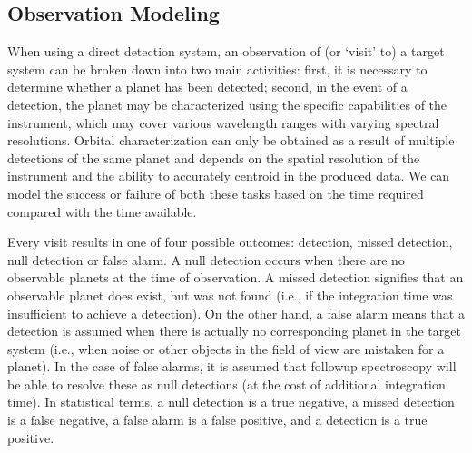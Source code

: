 \subsection{Observation Modeling}\label{sec:model_obs}
When using a direct detection system, an observation of (or `visit' to) a target system can be broken down into two main activities: first, it is necessary to determine whether a planet has been detected; second, in the event of a detection, the planet may be characterized using the specific capabilities of the instrument, which may cover various wavelength ranges with varying spectral resolutions.  Orbital characterization can only be obtained as a result of multiple detections of the same planet and depends on the spatial resolution of the instrument and the ability to accurately centroid in the produced data.  We can model the success or failure of both these tasks based on the time required compared with the time available.

Every visit results in one of four possible outcomes:  detection, missed detection, null detection or false alarm.  A null detection occurs when there are no observable planets at the time of observation.  A missed detection signifies that an observable planet does exist, but was not found (i.e., if the integration time was insufficient to achieve a detection).  On the other hand, a false alarm means that a detection is assumed when there is actually no corresponding planet in the target system (i.e., when noise or other objects in the field of view are mistaken for a planet).  In the case of false alarms, it is assumed that followup spectroscopy will be able to resolve these as null detections (at the cost of additional integration time). In statistical terms, a null detection is a true negative, a missed detection is a false negative, a false alarm is a false positive, and a detection is a true positive.

